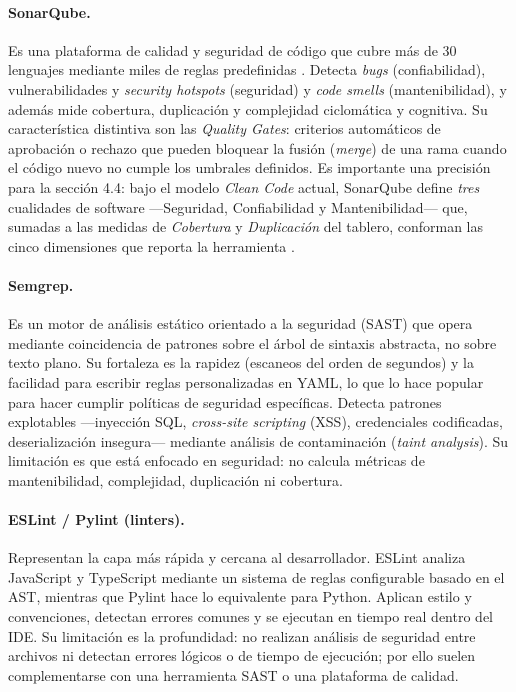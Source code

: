 \documentclass[12pt]{article}
\begin{document}
\paragraph{SonarQube.}
Es una plataforma de calidad y seguridad de código que cubre más de 30 lenguajes mediante
miles de reglas predefinidas \citep{sonarqubedocs}. Detecta \textit{bugs}
(confiabilidad), vulnerabilidades y \textit{security hotspots} (seguridad) y \textit{code
smells} (mantenibilidad), y además mide cobertura, duplicación y complejidad ciclomática y
cognitiva. Su característica distintiva son las \textit{Quality Gates}: criterios
automáticos de aprobación o rechazo que pueden bloquear la fusión (\textit{merge}) de una
rama cuando el código nuevo no cumple los umbrales definidos. Es importante una precisión
para la sección 4.4: bajo el modelo \textit{Clean Code} actual, SonarQube define
\emph{tres} cualidades de software ---Seguridad, Confiabilidad y Mantenibilidad--- que,
sumadas a las medidas de \emph{Cobertura} y \emph{Duplicación} del tablero, conforman las
cinco dimensiones que reporta la herramienta \citep{sonarqubedocs}.

\paragraph{Semgrep.}
Es un motor de análisis estático orientado a la seguridad (SAST) que opera mediante
coincidencia de patrones sobre el árbol de sintaxis abstracta, no sobre texto plano. Su
fortaleza es la rapidez (escaneos del orden de segundos) y la facilidad para escribir
reglas personalizadas en YAML, lo que lo hace popular para hacer cumplir políticas de
seguridad específicas. Detecta patrones explotables ---inyección SQL, \textit{cross-site
scripting} (XSS), credenciales codificadas, deserialización insegura--- mediante análisis
de contaminación (\textit{taint analysis}). Su limitación es que está enfocado en
seguridad: no calcula métricas de mantenibilidad, complejidad, duplicación ni cobertura.

\paragraph{ESLint / Pylint (linters).}
Representan la capa más rápida y cercana al desarrollador. ESLint analiza JavaScript y
TypeScript mediante un sistema de reglas configurable basado en el AST, mientras que Pylint
hace lo equivalente para Python. Aplican estilo y convenciones, detectan errores comunes y
se ejecutan en tiempo real dentro del IDE. Su limitación es la profundidad: no realizan
análisis de seguridad entre archivos ni detectan errores lógicos o de tiempo de ejecución;
por ello suelen complementarse con una herramienta SAST o una plataforma de calidad.
\end{document}
